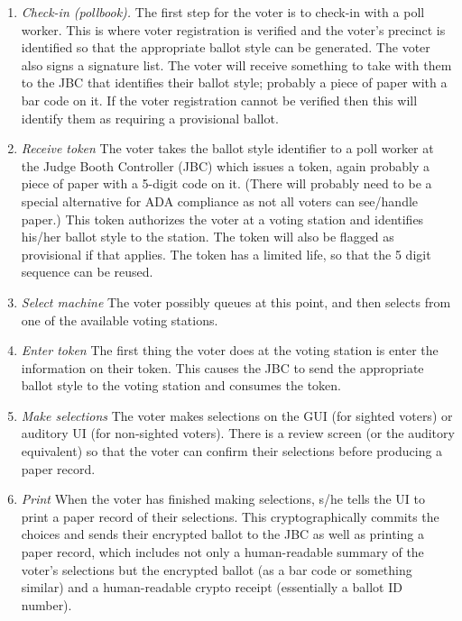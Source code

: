 \begin{enumerate}
\item {\em Check-in (pollbook).}
The first step for the voter is to check-in with a poll worker. This is where voter registration is verified and the voter's precinct is identified so that the appropriate ballot style can be generated. The voter also signs a signature list. The voter will receive something to take with them to the JBC that identifies their ballot style; probably a piece of paper with a bar code on it. If the voter registration cannot be verified then this will identify them as requiring a provisional ballot.

\item {\em Receive token}
The voter takes the ballot style identifier to a poll worker at the Judge Booth Controller (JBC) which issues a token, again probably a piece of paper with a 5-digit code on it. (There will probably need to be a special alternative for ADA compliance as not all voters can see/handle paper.) This token authorizes the voter at a voting station and identifies his/her ballot style to the station. The token will also be flagged as provisional if that applies. The token has a limited life, so that the 5 digit sequence can be reused.

\item {\em Select machine}
The voter possibly queues at this point, and then selects from one of the available voting stations.

\item  {\em Enter token}
The first thing the voter does at the voting station is enter the information on their token. This causes the JBC to send the appropriate ballot style to the voting station and consumes the token.

\item {\em Make selections}
The voter makes selections on the GUI (for sighted voters) or auditory UI (for non-sighted voters). There is a review screen (or the auditory equivalent) so that the voter can confirm their selections before producing a paper record.

\item {\em Print}
When the voter has finished making selections, s/he tells the UI to print a paper record of their selections. This cryptographically commits the choices and sends their encrypted ballot to the JBC as well as printing a paper record, which includes not only a human-readable summary of the voter's selections but the encrypted ballot (as a bar code or something similar) and a human-readable crypto receipt (essentially a ballot ID number).


\end{enumerate}
